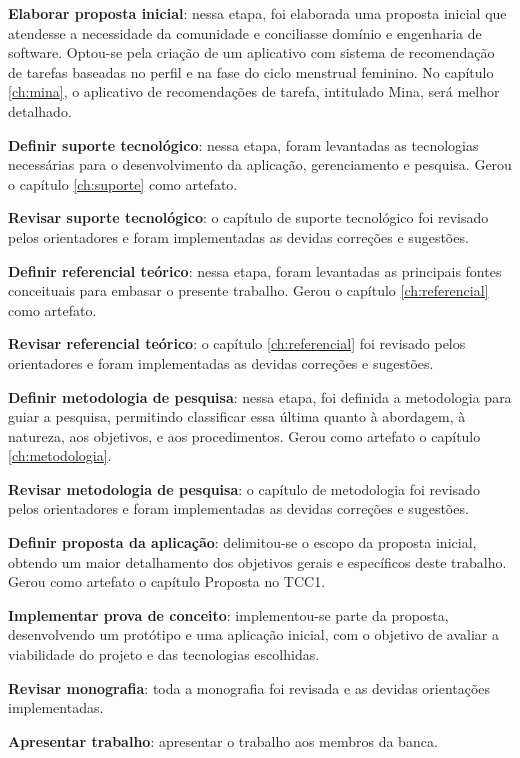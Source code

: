 \textbf{Elaborar proposta inicial}: nessa etapa, foi elaborada uma proposta inicial que 
atendesse a necessidade da comunidade e conciliasse domínio e engenharia de software. 
Optou-se pela criação de um aplicativo com sistema de recomendação de tarefas baseadas 
no perfil e
na fase do ciclo menstrual feminino. No capítulo \ref{ch:mina}, o aplicativo de recomendações de 
tarefa, intitulado Mina, será 
melhor detalhado.

\textbf{Definir suporte tecnológico}: nessa etapa, foram levantadas as tecnologias necessárias para o desenvolvimento da aplicação, 
gerenciamento e pesquisa. Gerou o capítulo \ref{ch:suporte} como artefato.

\textbf{Revisar suporte tecnológico}: o capítulo de suporte tecnológico foi revisado pelos orientadores e foram implementadas as devidas correções e sugestões.

\textbf{Definir referencial teórico}: nessa etapa, foram levantadas as principais fontes conceituais para embasar o presente trabalho. Gerou o capítulo \ref{ch:referencial} como artefato.

\textbf{Revisar referencial teórico}: o capítulo \ref{ch:referencial} foi revisado pelos orientadores e foram implementadas as devidas correções e sugestões.

\textbf{Definir metodologia de pesquisa}: nessa etapa, foi definida a metodologia 
para guiar a pesquisa, permitindo classificar essa última quanto
à abordagem, à natureza, aos objetivos, e aos procedimentos. Gerou como artefato o capítulo \ref{ch:metodologia}.

\textbf{Revisar metodologia de pesquisa}: o capítulo de metodologia foi revisado pelos orientadores e foram implementadas as devidas correções e sugestões.

\textbf{Definir proposta da aplicação}: delimitou-se o escopo da proposta inicial, obtendo um maior detalhamento 
dos objetivos gerais e específicos deste trabalho. Gerou como artefato o capítulo Proposta no TCC1.

\textbf{Implementar prova de conceito}: implementou-se parte da proposta, desenvolvendo um protótipo e uma aplicação inicial, com o objetivo 
de avaliar a viabilidade do projeto e das tecnologias escolhidas.

\textbf{Revisar monografia}: toda a monografia foi revisada e as devidas orientações implementadas.
 
\textbf{Apresentar trabalho}: apresentar o trabalho aos membros da banca.

